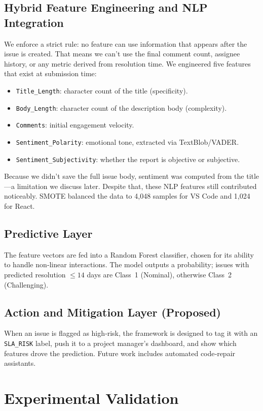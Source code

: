 \documentclass[conference]{IEEEtran}
\begin{document}
\subsection{Hybrid Feature Engineering and NLP Integration}
We enforce a strict rule: no feature can use information that appears after the issue is created. That means we can't use the final comment count, assignee history, or any metric derived from resolution time. We engineered five features that exist at submission time:
\begin{itemize}
    \item \texttt{Title\_Length}: character count of the title (specificity).
    \item \texttt{Body\_Length}: character count of the description body (complexity).
    \item \texttt{Comments}: initial engagement velocity.
    \item \texttt{Sentiment\_Polarity}: emotional tone, extracted via TextBlob/VADER.
    \item \texttt{Sentiment\_Subjectivity}: whether the report is objective or subjective.
\end{itemize}
Because we didn't save the full issue body, sentiment was computed from the title—a limitation we discuss later. Despite that, these NLP features still contributed noticeably. SMOTE balanced the data to 4,048 samples for VS Code and 1,024 for React.

\subsection{Predictive Layer}
The feature vectors are fed into a Random Forest classifier, chosen for its ability to handle non‑linear interactions. The model outputs a probability; issues with predicted resolution $\le 14$ days are Class~1 (Nominal), otherwise Class~2 (Challenging).

\subsection{Action and Mitigation Layer (Proposed)}
When an issue is flagged as high‑risk, the framework is designed to tag it with an \texttt{SLA\_RISK} label, push it to a project manager's dashboard, and show which features drove the prediction. Future work includes automated code‑repair assistants.

\section{Experimental Validation}
\end{document}
